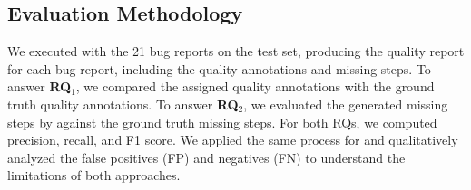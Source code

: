 \subsection{Evaluation Methodology} 

We executed \tool with the 21 bug reports on the test set,  producing the quality report for each bug report, including the quality annotations and missing steps. To answer \textbf{RQ$_{1}$}, we compared the \tool assigned quality annotations with the ground truth quality annotations. To answer \textbf{RQ$_{2}$}, we evaluated the generated missing steps by \tool against the ground truth missing steps. For both RQs, we computed precision, recall, and F1 score. We applied the same process for \EulerC and qualitatively analyzed the false positives (FP) and negatives (FN) to understand the limitations of both approaches.